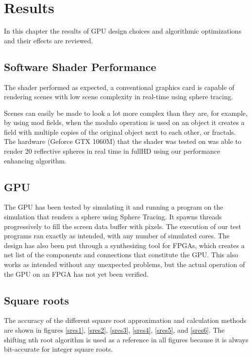 \chapter{Results}

	In this chapter the results of GPU design choices and algorithmic
	optimizations and their effects are reviewed.

	\section{Software Shader Performance}

		The shader performed as expected, a conventional graphics card is
		capable of rendering scenes with low scene complexity in real-time
		using sphere tracing.

		Scenes can easily be made to look a lot more complex than they
		are, for example, by using mod fields, when the modulo
		operation is used on an object it creates a field with multiple copies
		of the original object next to each other, or fractals. The hardware
		(Geforce GTX 1060M) that the shader was tested on was able to render 20
		reflective spheres in real time in fullHD using our performance
		enhancing algorithm.
 
	\section{GPU}
	
		The GPU has been tested by simulating it and running a program on the simulation 
		that renders a sphere using Sphere Tracing. It spawns threads
		progressively to fill the screen data buffer with pixels. The execution
		of our test programs ran exactly as intended, with any number of
		simulated cores. The design has also been put through a synthesizing
		tool for FPGAs, which creates a net list of the components and
		connections that constitute the GPU. This also works as intended
		without any unexpected problems, but the actual operation of the GPU on
		an FPGA has not yet been verified.
	
	\section{Square roots}
		
		The accuracy of the different square root approximation and calculation
		methods are shown in figures \ref{sres1}, \ref{sres2}, \ref{sres3},
		\ref{sres4}, \ref{sres5}, and \ref{sres6}. The shifting nth root
		algorithm is used as a reference in all figures because it is always
		bit-accurate for integer square roots.

